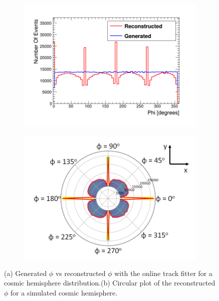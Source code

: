 \begin{figure}[!h]
\centering
\begin{subfigure}{.5\textwidth}
  \centering
  \includegraphics[width=\linewidth]{Chapter6/Figs/hemispherePhi_linHist.png}
  \captionsetup{width=.9\linewidth}
  \caption{} 
  \label{subFig:phiGenVsRecoHem}
\end{subfigure}%
\begin{subfigure}{.5\textwidth}
  \centering
\includegraphics[width=\linewidth]{Chapter6/Figs/hemispherePhi_cirHist.png}
  \captionsetup{width=.9\linewidth}
  \caption{}
  \label{subFig:cirPhiGenVsRecoHem}
\end{subfigure}
\caption{(a) Generated $\phi$ vs reconstructed $\phi$ with the online track fitter for a cosmic hemisphere distribution.(b) Circular plot of the reconstructed $\phi$ for a simulated cosmic hemisphere.}
\label{fig:linCirPhiGenVsRecoHem}
\end{figure}

